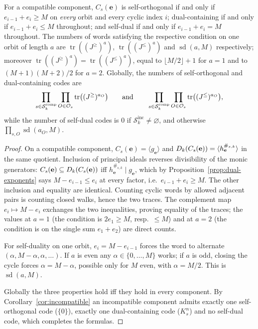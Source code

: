 \begin{proposition}\label{prop:extremal-counts}
For a compatible component, $C_s(\mathbf{e})$ is self-orthogonal if and only
if $e_{i-1}+e_i\geq M$ on \emph{every} orbit and every cyclic index $i$;
dual-containing if and only if $e_{i-1}+e_i\leq M$ throughout; and self-dual
if and only if $e_{i-1}+e_i=M$ throughout.  The numbers of words satisfying
the respective condition on one orbit of length $a$ are
$\operatorname{tr}((J^{\geq})^a)$, $\operatorname{tr}((J^{\leq})^a)$ and
$\operatorname{sd}(a,M)$ respectively; moreover
$\operatorname{tr}((J^{\geq})^a)=\operatorname{tr}((J^{\leq})^a)$, equal to
$\lfloor M/2\rfloor+1$ for $a=1$ and to $(M+1)(M+2)/2$ for $a=2$.
Globally, the numbers of self-orthogonal and dual-containing codes are
\[
\prod_{s\in\mathcal{S}_k^{\mathrm{comp}}}\prod_{O\in\mathcal O_s}
 \operatorname{tr}\bigl((J^{\geq})^{a_O}\bigr)
\qquad\text{and}\qquad
\prod_{s\in\mathcal{S}_k^{\mathrm{comp}}}\prod_{O\in\mathcal O_s}
 \operatorname{tr}\bigl((J^{\leq})^{a_O}\bigr),
\]
while the number of self-dual codes is $0$ if
$\mathcal{S}_k^{\mathrm{inc}}\neq\varnothing$, and otherwise
$\prod_{s,O}\operatorname{sd}(a_O,M)$.
\end{proposition}

\begin{proof}
On a compatible component, $C_s(\mathbf{e})=\langle g_{\mathbf{e}}\rangle$ and
$D_k(C_s(\mathbf{e}))=\langle h_{\mathbf{e}}^{\#_{s,k}}\rangle$ in the same
quotient.  Inclusion of principal ideals reverses divisibility of the monic
generators: $C_s(\mathbf{e})\subseteq D_k(C_s(\mathbf{e}))$ iff
$h_{\mathbf{e}}^{\#_{s,k}}\mid g_{\mathbf{e}}$, which by
Proposition~\ref{prop:dual-exponents} says $M-e_{i-1}\leq e_i$ at every factor,
i.e.\ $e_{i-1}+e_i\geq M$.  The other inclusion and equality are identical.
Counting cyclic words by allowed adjacent pairs is counting closed walks,
hence the two traces.  The complement map $e_i\mapsto M-e_i$ exchanges the two
inequalities, proving equality of the traces; the values at $a=1$ (the
condition is $2e_1\geq M$, resp.\ $\leq M$) and at $a=2$ (the condition is on
the single sum $e_1+e_2$) are direct counts.

For self-duality on one orbit, $e_i=M-e_{i-1}$ forces the word to alternate
$(\alpha,M-\alpha,\alpha,\ldots)$.  If $a$ is even any
$\alpha\in\{0,\ldots,M\}$ works; if $a$ is odd, closing the cycle forces
$\alpha=M-\alpha$, possible only for $M$ even, with $\alpha=M/2$.  This is
$\operatorname{sd}(a,M)$.

Globally the three properties hold iff they hold in every component.  By
Corollary~\ref{cor:incompatible} an incompatible component admits exactly one
self-orthogonal code ($\{0\}$), exactly one dual-containing code ($K_s^n$) and
no self-dual code, which completes the formulas.
\end{proof}

